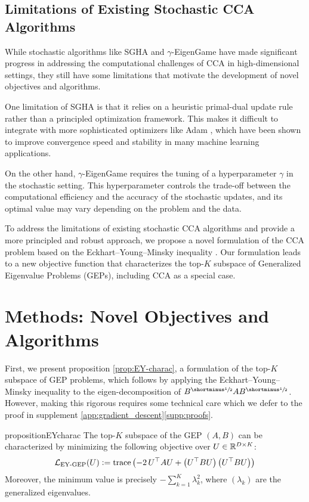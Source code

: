 \subsection{Limitations of Existing Stochastic CCA Algorithms}
While stochastic algorithms like SGHA and $\gamma$-EigenGame have made significant progress in addressing the computational challenges of CCA in high-dimensional settings, they still have some limitations that motivate the development of novel objectives and algorithms.

One limitation of SGHA is that it relies on a heuristic primal-dual update rule rather than a principled optimization framework. This makes it difficult to integrate with more sophisticated optimizers like Adam \citep{kingma2014adam}, which have been shown to improve convergence speed and stability in many machine learning applications.

On the other hand, $\gamma$-EigenGame requires the tuning of a hyperparameter $\gamma$ in the stochastic setting. This hyperparameter controls the trade-off between the computational efficiency and the accuracy of the stochastic updates, and its optimal value may vary depending on the problem and the data.

To address the limitations of existing stochastic CCA algorithms and provide a more principled and robust approach, we propose a novel formulation of the CCA problem based on the Eckhart--Young--Minsky inequality \citep{stewart_matrix_1990}. Our formulation leads to a new objective function that characterizes the top-$K$ subspace of Generalized Eigenvalue Problems (GEPs), including CCA as a special case.

\section{Methods: Novel Objectives and Algorithms}\label{sec:contributions}

First, we present proposition \ref{prop:EY-charac}, a formulation of the top-$K$ subspace of GEP problems, which follows by applying the Eckhart--Young--Minsky inequality \citep{stewart_matrix_1990} to the eigen-decomposition of $B^\mhalf A B^\mhalf$. However, making this rigorous requires some technical care which we defer to the proof in supplement \ref{app:gradient_descent}\ref{supp:proofs}.   

\begin{restatable}{proposition}{EYcharac}
\label{prop:EY-charac}
    The top-$K$ subspace of the GEP $(A,B)$ can be characterized by minimizing the following objective over $U \in \mathbb{R}^{D \times K}$:
    \begin{align}\label{eq:EY-charac}
        \mathcal{L}_\text{EY-GEP}(U) \vcentcolon= \operatorname{trace} \left( - 2\,U^\top A U + \left(U^\top B U\right) \left(U^\top B U\right) \right)
    \end{align}
    Moreover, the minimum value is precisely $- \sum_{k=1}^K \lambda_k^2$, where $(\lambda_k)$ are the generalized eigenvalues.
\end{restatable}

